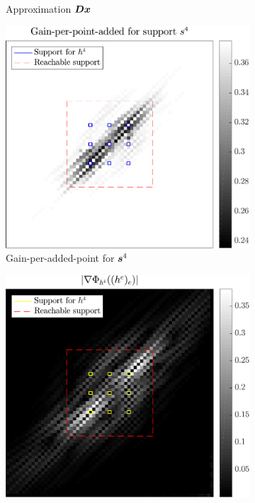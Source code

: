 \begin{figure}[!ht]
\begin{subfigure}[b]{0.4\linewidth}
\caption{Approximation $\bm{D}\bm{x}$} \label{fig_gain_n4_approx}
\end{subfigure}
\begin{subfigure}[b]{0.4\linewidth}\centering
\includegraphics[width=\linewidth]{figures/xp/n4/xp_128x128_sc2_angl1_K3_S3_node4_objmatrix.pdf}
\caption{Gain-per-added-point for $\bm{s}^4$}
\end{subfigure}
\begin{subfigure}[b]{0.4\linewidth}\centering
\includegraphics[width=\linewidth]{figures/xp/n4/xp_128x128_sc2_angl1_K3_S3_node4_partgrad4.pdf}

\end{subfigure}
\end{figure}
